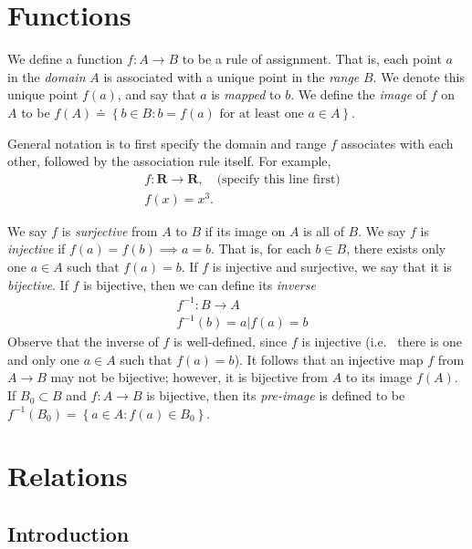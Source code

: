 \section{Functions}
We define a function $f: A \to B$ to be a rule of assignment. That is,
each point $a$ in the \emph{domain} $A$ is associated with a unique point in
the \emph{range} $B$. We denote this unique point $f(a)$, and say that
$a$ is \emph{mapped} to $b$. We define the \emph{image} of $f$ on $A$ to be
$f(A) \doteq \left\{ b \in B: b = f(a) \text{ for at least one } a \in A
\right\}$.
\begin{example}
General notation is to first specify the domain and range $f$ associates with each
other, followed by the association rule itself. For example,
\begin{equation*}
\begin{split}
& f: \mathbf{R} \to \mathbf{R}, \quad \text{(specify this line first)}\\
& f(x) = x^{3}.
\end{split}
\end{equation*}
\end{example}
We say $f$ is \emph{surjective} from $A$ to $B$ if its image on $A$ is all of
$B$. We say $f$ is \emph{injective} if $f(a) = f(b) \implies a = b$. That is,
for each $b \in B$, there exists only one $a \in A$ such that $f(a) = b$.
If $f$ is injective and surjective, we say that it is \emph{bijective}.
If $f$ is bijective, then we can define its \emph{inverse}
\begin{equation*}
\begin{split}
& f^{-1}: B \to A
\\
& f^{-1}(b) = a | f(a) = b
\end{split}
\end{equation*}
Observe that the inverse of $f$ is well-defined, since $f$ is injective (i.e. \
there is one and only one $a \in A$ such that $f(a) = b$). It follows that
an injective map $f$ from $A \to B$ may not be bijective; however, it is
bijective from $A$ to its image $f(A)$. If $B_{0} \subset B$ and $f: A \to B$ is
bijective, then its
\emph{pre-image} is defined to be $f^{-1}(B_{0}) = \left\{ a \in A: f(a) \in
B_{0} \right\}$.
\section{Relations}
\subsection{Introduction}

